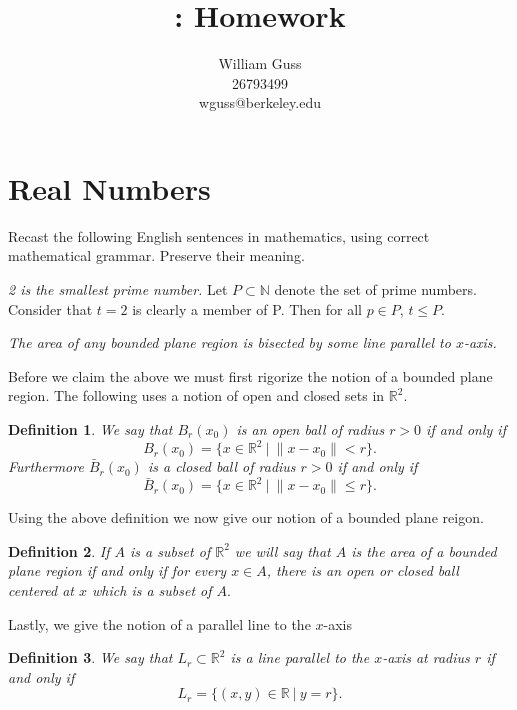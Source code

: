 \documentclass[letter]{article}
\title{\bCLASS: Homework \bHWN}
\author{William Guss\\26793499\\wguss@berkeley.edu}
\newtheorem{definition}{Definition}
\newenvironment{menumerate}{%
  \edef\backupindent{\the\parindent}%
  \enumerate%
  \setlength{\parindent}{\backupindent}%
}{\endenumerate}
\begin{document}
\maketitle
\thispagestyle{empty}


\section{Real Numbers}

\begin{menumerate}
	\setcounter{enumi}{2}
	\item Recast the following English sentences in mathematics, using correct mathematical grammar. Preserve their meaning.
		\begin{menumerate}
			\item \textit{2 is the smallest prime number.} Let $P \subset \mathbb{N}$ denote the set of prime numbers.
			Consider that $t = 2$ is clearly a member of P.
			Then for all $p \in P$, $t \leq P$.

			\item \textit{The area of any bounded plane region is bisected by some line parallel to $x$-axis.} 

			Before we claim the above we must first rigorize the notion of a bounded plane region. The following uses a notion of open and closed sets in $\mathbb{R}^2$.

			\begin{definition}
				 We say that $B_r(x_0)$ is an open ball of radius $r>0$ if and only if
				 $$B_r(x_0) = \{ x \in \mathbb{R}^2 \ |\ \|x - x_0 \| < r \}.$$
				 Furthermore $\bar{B}_r(x_0)$ is a closed ball of radius $r>0$ if and only if
				 $$\bar{B}_r(x_0) = \{ x \in \mathbb{R}^2 \ |\ \|x - x_0 \| \leq r \}.$$
			 \end{definition} 
 			 Using the above definition we now give our notion of a bounded plane reigon. 
 			 \begin{definition}
 			 	If $A$ is a subset of $\mathbb{R}^2$ we will say that $A$ is the area of a bounded plane region if and only if for every $x \in A$, there is an open or closed ball centered at $x$ which is a subset of $A.$
 			 \end{definition}
 			 Lastly, we give the notion of a parallel line to the $x$-axis
 			 \begin{definition}
 			 	We say that $L_r \subset \mathbb{R}^2$ is a line parallel to the $x$-axis at radius $r$ if and only if 
 			 		$$L_r = \{ (x,y) \in \mathbb{R}\ | \ y = r \}.$$ 
 			 \end{definition}
			 

\end{menumerate}
\end{menumerate}
\end{document}
